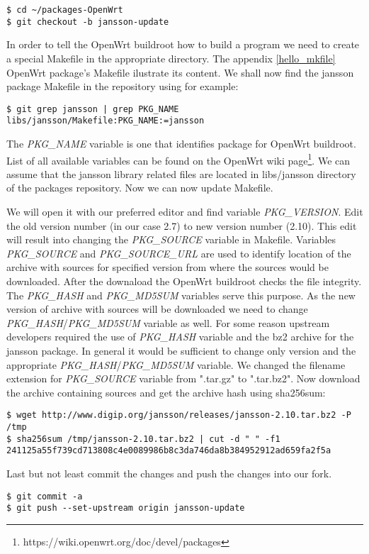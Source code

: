 \begin{lstlisting}[columns=fixed,basicstyle=\ttfamily\footnotesize,tabsize=4,backgroundcolor=\color{yellow!10}]
$ cd ~/packages-OpenWrt
$ git checkout -b jansson-update
\end{lstlisting}
In order to tell the OpenWrt buildroot how to build a program we need to create a special Makefile in the appropriate directory.
The appendix \ref{hello_mkfile} OpenWrt package's Makefile ilustrate its content.
We shall now find the jansson package Makefile in the repository using for example:
\begin{lstlisting}[columns=fixed,basicstyle=\ttfamily\footnotesize,tabsize=4,backgroundcolor=\color{yellow!10}]
$ git grep jansson | grep PKG_NAME
libs/jansson/Makefile:PKG_NAME:=jansson
\end{lstlisting}
The {\it PKG\_NAME} variable is one that identifies package for OpenWrt buildroot\cite{creating_pkgs}.
List of all available variables can be found on the OpenWrt wiki page\footnote{https://wiki.openwrt.org/doc/devel/packages}.
We can assume that the jansson library related files are located in libs/jansson directory of the packages repository.
Now we can now update Makefile.

We will open it with our preferred editor and find variable {\it PKG\_VERSION}.
Edit the old version number (in our case 2.7) to new version number (2.10).
This edit will result into changing the {\it PKG\_SOURCE} variable in Makefile.
Variables {\it PKG\_SOURCE} and {\it PKG\_SOURCE\_URL} are used to identify location of the archive with sources for specified version from where the sources would be downloaded.
After the downaload the OpenWrt buildroot checks the file integrity.
The {\it PKG\_HASH} and {\it PKG\_MD5SUM} variables serve this purpose.
As the new version of archive with sources will be downloaded we need to change {\it PKG\_HASH}/{\it PKG\_MD5SUM} variable as well.
For some reason upstream developers required the use of {\it PKG\_HASH} variable and the bz2 archive for the jansson package.
In general it would be sufficient to change only version and the appropriate {\it PKG\_HASH}/{\it PKG\_MD5SUM} variable.
We changed the filename extension for {\it PKG\_SOURCE} variable from ".tar.gz" to ".tar.bz2".
Now download the archive containing sources and get the archive hash using sha256sum:
\begin{lstlisting}[columns=fixed,basicstyle=\ttfamily\footnotesize,tabsize=4,backgroundcolor=\color{yellow!10}]
$ wget http://www.digip.org/jansson/releases/jansson-2.10.tar.bz2 -P /tmp
$ sha256sum /tmp/jansson-2.10.tar.bz2 | cut -d " " -f1
241125a55f739cd713808c4e0089986b8c3da746da8b384952912ad659fa2f5a
\end{lstlisting}
Last but not least commit the changes and push the changes into our fork.
\begin{lstlisting}[columns=fixed,basicstyle=\ttfamily\footnotesize,tabsize=4,backgroundcolor=\color{yellow!10}]
$ git commit -a
$ git push --set-upstream origin jansson-update
\end{lstlisting}

